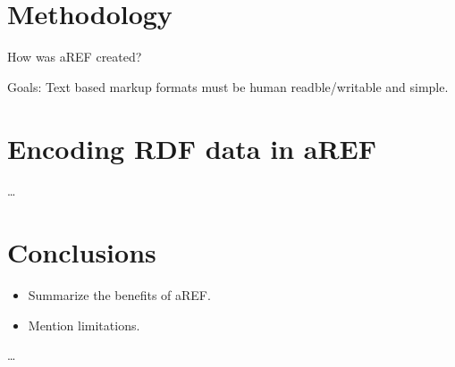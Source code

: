 \documentclass[sw]{iosart2c}
\begin{document}
\section{Methodology}

How was aREF created?

Goals: Text based markup formats must be human readble/writable and simple.


\section{Encoding RDF data in aREF}

\ldots

\section{Conclusions}


\begin{itemize}
    \item Summarize the benefits of aREF.
    \item Mention limitations.
\end{itemize}

\ldots






\end{document}
